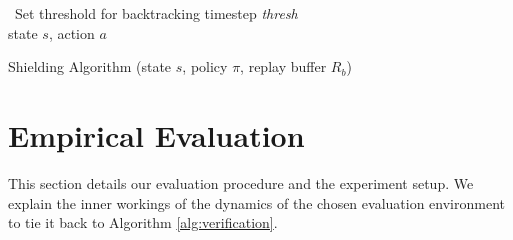 \documentclass[acmsmall,review,authorversion]{acmart}
\begin{document}
    \begin{algorithm}[hbt]
    \
        Set threshold for backtracking timestep \emph{thresh} \\
        
          \Return state $s$, action $a$
     \caption{Shielding Algorithm (state $s$, policy $\pi$, replay buffer $R_b$)}
     \label{alg:verification}
    \end{algorithm}{}

\section{Empirical Evaluation}
\label{section:evaluation}
This section details our evaluation procedure and the experiment setup. We explain the inner workings of the dynamics of the chosen evaluation environment to tie it back to Algorithm \ref{alg:verification}.
\end{document}
